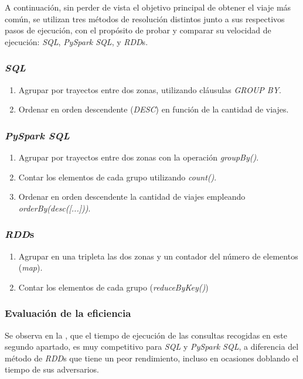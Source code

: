 A continuación, sin perder de vista el objetivo principal de obtener el viaje más común, se utilizan tres métodos de resolución distintos junto a sus respectivos pasos de ejecución, con el propósito de probar y comparar su velocidad de ejecución: \textit{SQL}, \textit{PySpark SQL}, y \textit{RDD}s.

\newpage
\subsubsection*{\textit{SQL}}
\begin{enumerate}
  \item Agrupar por trayectos entre dos zonas, utilizando cláusulas \textit{GROUP BY}.
  \item Ordenar en orden descendente (\textit{DESC}) en función de la cantidad de viajes.
\end{enumerate}

\subsubsection*{\textit{PySpark SQL}}
\begin{enumerate}
  \item Agrupar por trayectos entre dos zonas con la operación \textit{groupBy()}.
  \item Contar los elementos de cada grupo utilizando \textit{count()}.
  \item Ordenar en orden descendente la cantidad de viajes empleando \textit{orderBy(desc([...]))}.
\end{enumerate}

\subsubsection*{\textit{RDD}s}
\begin{enumerate}
  \item Agrupar en una tripleta las dos zonas y un contador del número de elementos (\textit{map}).
  \item Contar los elementos de cada grupo (\textit{reduceByKey()})
\end{enumerate}


\subsubsection*{Evaluación de la eficiencia}
Se observa en la , que el tiempo de ejecución de las consultas recogidas en este segundo apartado, es muy competitivo para \textit{SQL} y \textit{PySpark SQL}, a diferencia del método de \textit{RDD}s que tiene un peor rendimiento, incluso en ocasiones doblando el tiempo de sus adversarios.

